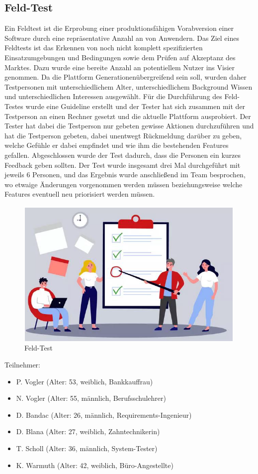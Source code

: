 \subsection{Feld-Test}
\label{sub:UmsetzungTestFeld}

Ein Feldtest ist die Erprobung einer produktionsfähigen Vorabversion einer Software durch eine repräsentative Anzahl an von Anwendern. Das Ziel eines Feldtests ist das Erkennen von noch nicht komplett spezifizierten Einsatzumgebungen und Bedingungen sowie dem Prüfen auf Akzeptanz des Marktes.
Dazu wurde eine bereite Anzahl an potentiellem Nutzer ins Visier genommen. Da die Plattform Generationenübergreifend sein soll, wurden daher Testpersonen mit unterschiedlichem Alter, unterschiedlichem Background Wissen und unterschiedlichen Interessen ausgewählt.
Für die Durchführung des Feld-Testes wurde eine Guideline erstellt und der Tester hat sich zusammen mit der Testperson an einen Rechner gesetzt und die aktuelle Plattform ausprobiert. Der Tester hat dabei die Testperson nur gebeten gewisse Aktionen durchzuführen und hat die Testperson gebeten, dabei unentwegt Rückmeldung darüber zu geben, welche Gefühle er dabei empfindet und wie ihm die bestehenden Features gefallen. Abgeschlossen wurde der Test dadurch, dass die Personen ein kurzes Feedback geben sollten.
Der Test wurde insgesamt drei Mal durchgeführt mit jeweils 6 Personen, und das Ergebnis wurde anschließend im Team besprochen, wo etwaige Änderungen vorgenommen werden müssen beziehungsweise welche Features eventuell neu priorisiert werden müssen.

\begin{figure}[!htb]
    \centering
    \includegraphics[width=.8\textwidth]{figures/rebecca/Feld_Test_Konzept.png}
    \caption[]{Feld-Test}
    \label{fig:Feldtest}
\end{figure}

Teilnehmer:
\begin{itemize}
    \item P. Vogler (Alter: 53, weiblich, Bankkauffrau)
    \item N. Vogler (Alter: 55, männlich, Berufsschulehrer)
    \item D. Bandac (Alter: 26, männlich, Requirements-Ingenieur)
    \item D. Blana (Alter: 27, weiblich, Zahntechnikerin)
    \item T. Scholl (Alter: 36, männlich, System-Tester)
    \item K. Warmuth (Alter: 42, weiblich, Büro-Angestellte)
\end{itemize}

